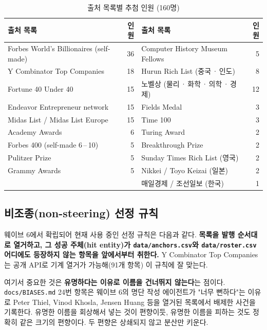 \documentclass[11pt]{article}
\begin{document}
\begin{table}[h]
\centering
\caption{출처 목록별 추첨 인원 (160명)}
\begin{tabular}{L R L R}
\toprule
출처 목록 & 인원 & 출처 목록 & 인원 \\
\midrule
Forbes World's Billionaires (self-made) & 36 & Computer History Museum Fellows & 5 \\
Y Combinator Top Companies              & 18 & Hurun Rich List (중국\,·\,인도)  & 8 \\
Fortune 40 Under 40                     & 15 & 노벨상 (물리\,·\,화학\,·\,의학\,·\,경제) & 12 \\
Endeavor Entrepreneur network           & 15 & Fields Medal                    & 3 \\
Midas List / Midas List Europe          & 15 & Time 100                        & 3 \\
Academy Awards                          & \phantom{0}6 & Turing Award            & 2 \\
Forbes 400 (self-made 6\,--\,10)        & \phantom{0}5 & Breakthrough Prize      & 2 \\
Pulitzer Prize                          & \phantom{0}5 & Sunday Times Rich List (영국) & 2 \\
Grammy Awards                           & \phantom{0}5 & Nikkei / Toyo Keizai (일본) & 2 \\
                                        &              & 매일경제 / 조선일보 (한국) & 1 \\
\bottomrule
\end{tabular}
\end{table}

\subsection{비조종(non-steering) 선정 규칙}

웨이브 6에서 확립되어 현재 사용 중인 선정 규칙은 다음과 같다.
\textbf{목록을 발행 순서대로 열거하고, 그 성공 주체(hit entity)가
\texttt{data/anchors.csv}와 \texttt{data/roster.csv} 어디에도 등장하지 않는 항목을 앞에서부터 취한다.}
Y Combinator Top Companies는 공개 API로 기계 열거가 가능해(91개 항목) 이 규칙에 잘 맞는다.

여기서 중요한 것은 \textbf{유명하다는 이유로 이름을 건너뛰지 않는다}는 점이다.
\texttt{docs/BIASES.md} 24번 항목은 웨이브 6의 명단 작성 에이전트가
"너무 뻔하다"는 이유로 Peter Thiel, Vinod Khosla, Jensen Huang 등을 열거된 목록에서 배제한 사건을 기록한다.
유명한 이름을 회상해서 넣는 것이 편향이듯, 유명한 이름을 피하는 것도 정확히 같은 크기의 편향이다.
두 편향은 상쇄되지 않고 분산만 키운다.
\end{document}
